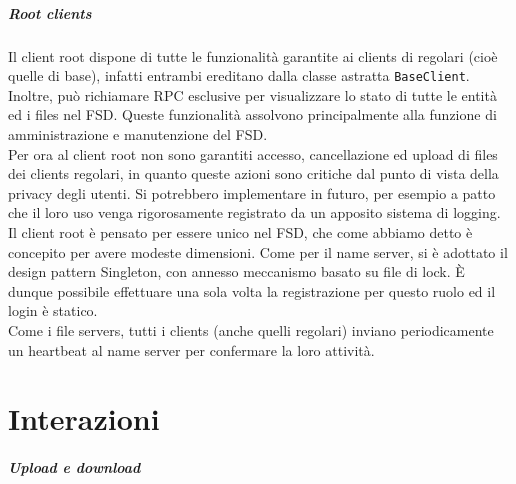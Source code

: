\documentclass[a4paper, 12pt]{scrreprt}
\begin{document}
        \paragraph{Root clients}

            Il client root dispone di tutte le funzionalità garantite ai clients di regolari (cioè quelle di base), infatti entrambi ereditano dalla classe astratta \texttt{BaseClient}. Inoltre, può richiamare RPC esclusive per visualizzare lo stato di tutte le entità ed i files nel FSD. Queste funzionalità assolvono principalmente alla funzione di amministrazione e manutenzione del FSD.\\
            Per ora al client root non sono garantiti accesso, cancellazione ed upload di files dei clients regolari, in quanto queste azioni sono critiche dal punto di vista della privacy degli utenti. Si potrebbero implementare in futuro, per esempio a patto che il loro uso venga rigorosamente registrato da un apposito sistema di logging.\\
            Il client root è pensato per essere unico nel FSD, che come abbiamo detto è concepito per avere modeste dimensioni. Come per il name server, si è adottato il design pattern Singleton, con annesso meccanismo basato su file di lock. È dunque possibile effettuare una sola volta la registrazione per questo ruolo ed il login è statico.\\
            Come i file servers, tutti i clients (anche quelli regolari) inviano periodicamente un heartbeat al name server per confermare la loro attività.

    \chapter{Interazioni}

        \paragraph{Upload e download}
\end{document}

